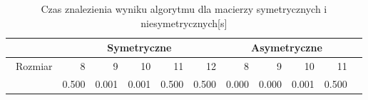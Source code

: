 \begin{table}
\centering
\begin{tabular}{|r|r|r|r|r|r|r|r|r|r|r|}
\hline
 & \multicolumn{5}{|c|}{Symetryczne} & \multicolumn{4}{|c|}{Asymetryczne} \\ \hline\
Rozmiar & 8 & 9 & 10 & 11 & 12 & 8 & 9 & 10 & 11 \\ \hline
& 0.500 & 0.001 & 0.001 & 0.500 & 0.500 & 0.000 & 0.000 & 0.001 & 0.500 \\ \hline
\end{tabular}
\caption{Czas znalezienia wyniku algorytmu dla macierzy symetrycznych i niesymetrycznych[s]}
\label{tab:time_PrevTS}
\end{table}
